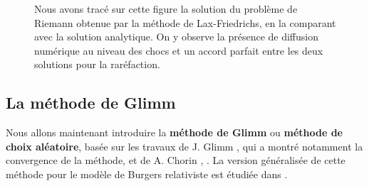 \documentclass[11pt,a4paper]{article}
\begin{document}
\begin{figure}
\caption{Nous avons tracé sur cette figure la solution du problème de Riemann obtenue par la méthode de Lax-Friedrichs, en la comparant avec la solution analytique. On y observe la présence de diffusion numérique au niveau des chocs et un accord parfait entre les deux solutions pour la raréfaction.}\label{figure_lax}
\end{figure}

\subsection{La méthode de Glimm}

Nous allons maintenant introduire la \textbf{méthode de Glimm} ou \textbf{méthode de choix aléatoire}, basée sur les travaux de J. Glimm \cite{glimm1965solutions}, qui a montré notamment la  convergence de la méthode, et de A. Chorin \cite{chorin1976random}, \cite{chorin1977random}. La version généralisée de cette méthode pour le modèle de Burgers relativiste est étudiée dans \cite{PLF-SX-one}. %
\end{document}
